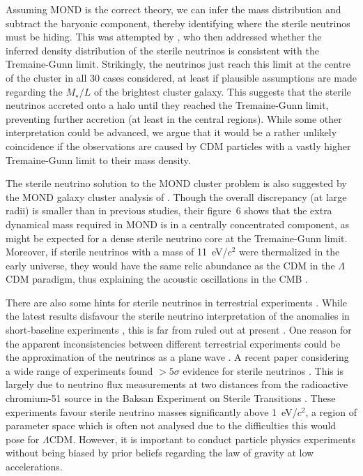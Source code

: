 \documentclass[fleqn,usenatbib,useAMS,onecolumn]{mnras} %
\begin{document}
Assuming MOND is the correct theory, we can infer the mass distribution and subtract the baryonic component, thereby identifying where the sterile neutrinos must be hiding. This was attempted by \citet{Angus_2010}, who then addressed whether the inferred density distribution of the sterile neutrinos is consistent with the Tremaine-Gunn limit. Strikingly, the neutrinos just reach this limit at the centre of the cluster in all 30 cases considered, at least if plausible assumptions are made regarding the $M_{\star}/L$ of the brightest cluster galaxy. This suggests that the sterile neutrinos accreted onto a halo until they reached the Tremaine-Gunn limit, preventing further accretion (at least in the central regions). While some other interpretation could be advanced, we argue that it would be a rather unlikely coincidence if the observations are caused by CDM particles with a vastly higher Tremaine-Gunn limit to their mass density.

The sterile neutrino solution to the MOND cluster problem is also suggested by the MOND galaxy cluster analysis of \citet{Ettori_2019}. Though the overall discrepancy (at large radii) is smaller than in previous studies, their figure~6 shows that the extra dynamical mass required in MOND is in a centrally concentrated component, as might be expected for a dense sterile neutrino core at the Tremaine-Gunn limit. Moreover, if sterile neutrinos with a mass of 11~eV/$c^2$ were thermalized in the early universe, they would have the same relic abundance as the CDM in the $\Lambda$CDM paradigm, thus explaining the acoustic oscillations in the CMB \citep[Section~\ref{nuHDM_early}; see also][]{Angus_2009, Haslbauer_2020}.

There are also some hints for sterile neutrinos in terrestrial experiments \citep[for a review, see][]{Giunti_2019}. While the latest results disfavour the sterile neutrino interpretation of the anomalies in short-baseline experiments \citep{Microboone_2022}, this is far from ruled out at present \citep{Arguelles_2022a}. One reason for the apparent inconsistencies between different terrestrial experiments could be the approximation of the neutrinos as a plane wave \citep{Arguelles_2022b}. A recent paper considering a wide range of experiments found $>5\sigma$ evidence for sterile neutrinos \citep{Berryman_2022}. This is largely due to neutrino flux measurements at two distances from the radioactive chromium-51 source in the Baksan Experiment on Sterile Transitions \citep[BEST;][]{Barinov_2022a, Barinov_2022b, Barinov_2022c}. These experiments favour sterile neutrino masses significantly above 1~eV/$c^2$, a region of parameter space which is often not analysed due to the difficulties this would pose for $\Lambda$CDM. However, it is important to conduct particle physics experiments without being biased by prior beliefs regarding the law of gravity at low accelerations.
\end{document}
